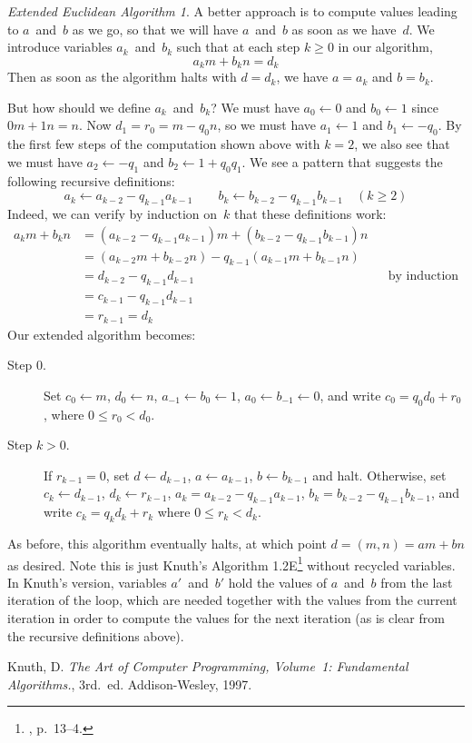 \documentclass[letterpaper,12pt]{article}
\newcommand{\set}{\leftarrow}
\theoremstyle{remark}
\newtheorem*{extendedeuclid}{Extended Euclidean Algorithm}
\begin{document}
\begin{extendedeuclid}
A better approach is to compute values leading to \(a\)~and~\(b\) as we go, so that we will have \(a\)~and~\(b\) as soon as we have~\(d\). We introduce variables \(a_{k}\)~and~\(b_{k}\) such that at each step \(k\ge0\) in our algorithm,
\begin{equation}
a_{k}m+b_{k}n=d_{k}
\end{equation}
Then as soon as the algorithm halts with \(d=d_{k}\), we have \(a=a_{k}\) and \(b=b_{k}\).

But how should we define \(a_{k}\)~and~\(b_{k}\)? We must have \(a_{0}\set0\) and \(b_{0}\set1\) since \(0m+1n=n\). Now \(d_{1}=r_{0}=m-q_{0}n\), so we must have \(a_{1}\set1\) and \(b_{1}\set-q_{0}\). By the first few steps of the computation shown above with \(k=2\), we also see that we must have \(a_{2}\set-q_{1}\) and \(b_{2}\set1+q_{0}q_{1}\). We see a pattern that suggests the following recursive definitions:
\begin{equation}
a_{k}\set a_{k-2}-q_{k-1}a_{k-1}\qquad b_{k}\set b_{k-2}-q_{k-1}b_{k-1}\quad(k\ge2)
\end{equation}
Indeed, we can verify by induction on~\(k\) that these definitions work:
\begin{align*}
a_{k}m+b_{k}n&=(a_{k-2}-q_{k-1}a_{k-1})m+(b_{k-2}-q_{k-1}b_{k-1})n&&\\
			&=(a_{k-2}m+b_{k-2}n)-q_{k-1}(a_{k-1}m+b_{k-1}n)&&\\
			&=d_{k-2}-q_{k-1}d_{k-1}&&\text{by induction}\\
			&=c_{k-1}-q_{k-1}d_{k-1}&&\\
			&=r_{k-1}=d_{k}
\end{align*}
Our extended algorithm becomes:
\begin{description}
\item[Step 0.] Set \(c_{0}\set m\), \(d_{0}\set n\), \(a_{-1}\set b_{0}\set1\), \(a_{0}\set b_{-1}\set0\), and write \(c_{0}=q_{0}d_{0}+r_{0}\), where \(0\le r_{0}<d_{0}\).
\item[Step \(k>0\).] If \(r_{k-1}=0\), set \(d\set d_{k-1}\), \(a\set a_{k-1}\), \(b\set b_{k-1}\) and halt. Otherwise, set \(c_{k}\set d_{k-1}\), \(d_{k}\set r_{k-1}\), \(a_{k}=a_{k-2}-q_{k-1}a_{k-1}\), \(b_{k}=b_{k-2}-q_{k-1}b_{k-1}\), and write \(c_{k}=q_{k}d_{k}+r_{k}\) where \(0\le r_{k}<d_{k}\).
\end{description}
As before, this algorithm eventually halts, at which point \(d=(m,n)=am+bn\) as desired. Note this is just Knuth's Algorithm 1.2E\footnote{\cite{knuth1}, p.~13--4.} without recycled variables. In Knuth's version, variables \(a'\)~and~\(b'\) hold the values of \(a\)~and~\(b\) from the last iteration of the loop, which are needed together with the values from the current iteration in order to compute the values for the next iteration (as is clear from the recursive definitions above).
\end{extendedeuclid}

\begin{thebibliography}{0}
 Knuth, D. \textit{The Art of Computer Programming, Volume~1: Fundamental Algorithms.}, 3rd.~ed. Addison-Wesley, 1997.
\end{thebibliography}
\end{document}
